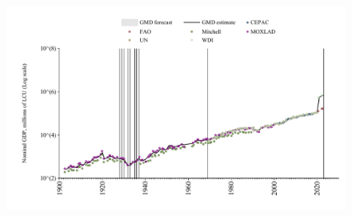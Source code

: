 \documentclass[12pt,a4paper,landscape]{article}
\begin{document}
\begin{adjustbox}{max totalsize={\paperwidth}{\paperheight},center}
\begin{minipage}[t][\textheight][t]{\textwidth}
\begin{figure}[H]
\includegraphics[width=\textwidth,height=0.6\textheight,keepaspectratio]{graphs/CUB_nGDP.pdf}
\end{figure}
\end{minipage}
\end{adjustbox}
\end{document}
